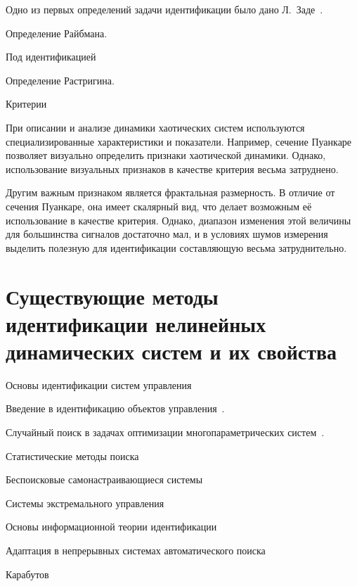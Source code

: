 Одно из первых определений задачи идентификации было дано
Л.~Заде~\cite{zadeh_id_1956}.

Определение Райбмана.

Под идентификацией

Определение Растригина.



Критерии

При описании и анализе динамики хаотических
систем используются специализированные характеристики и показатели.
Например, сечение Пуанкаре~\cite{moon_chaotic_vibr,atu_st105}
позволяет визуально определить признаки хаотической динамики.
Однако, использование визуальных признаков в качестве критерия
весьма затруднено.

Другим важным признаком является фрактальная размерность. %
В отличие от сечения Пуанкаре, она имеет скалярный вид,
что делает возможным её использование в качестве критерия.
Однако, диапазон изменения этой величины для большинства сигналов достаточно мал,
и в условиях шумов измерения выделить полезную
для идентификации составляющую весьма затруднительно.


\section{Существующие методы идентификации нелинейных динамических систем и их свойства}  %


Основы идентификации систем управления~\cite{eykhoff_id_base,eykhoff_modern_id,gropp_methods_id,deith_method_id_ds,lung_id_sys,seidg_id_su,leondes_modern_tu,nelles_nlsys_id}

Введение в идентификацию объектов управления~\cite{rastr_intro,rastr_adop_complex_sys}.

Случайный поиск в задачах оптимизации многопараметрических систем~\cite{rastr_rand_search,rastr_rand_search_adopt}.

Статистические методы поиска~\cite{rastr_stat_meth_search}

Беспоисковые самонастраивающиеся системы~\cite{kozlov_nosearch_sns}

Системы экстремального управления~\cite{rastr_seu,kras_dyn_nsn}

Основы информационной теории идентификации~\cite{info_cipkin,straton_inf,karabut}

Адаптация в непрерывных системах автоматического поиска~\cite{adopt_cont_sys}

Карабутов~\cite{karabutov_adapt_id_sys,saliga_id_ctl_black}

